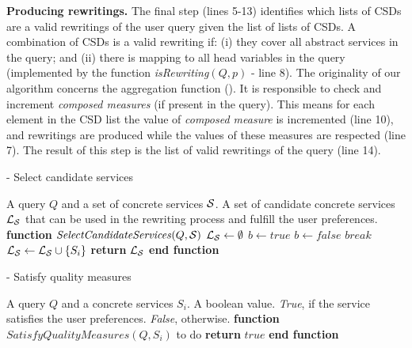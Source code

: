 \noindent \textbf{Producing rewritings.} The final step (lines 5-13) identifies which lists of CSDs are a valid
rewritings of the user query given the list of lists of CSDs.
A combination of CSDs is a valid rewriting if: (i) they cover all abstract services in the query; and 
(ii) there is mapping to all head variables in the query (implemented by the function \textit{isRewriting}$(Q, p)$ - line 8).
The originality of our algorithm concerns the aggregation function ().
It is responsible to check and increment \textit{composed measures} (if present in the query). 
This means for each element in the CSD list the value of \textit{composed measure} is incremented (line 10), and rewritings are produced while the values of these measures are respected (line 7). 
The result of this step is the list of valid 
 rewritings of the query (line 14).%
 
\begin{algorithm}
\caption{ - Select candidate services}
\label{selectingservices}
\begin{algorithmic}[1]
\REQUIRE A query $Q$ and a set of concrete services $\hbox{${\cal S}$}$.
\ENSURE A set of candidate concrete services $\hbox{${\cal L_{S}}$}$ that can be used in the rewriting process and fulfill the user preferences.
\STATE \textbf{function} $\mathit{SelectCandidateServices} (Q, \hbox{${\cal S}$})$
\STATE $\hbox{${\cal L_{S}}$} \leftarrow \emptyset$
		\STATE $b \leftarrow \mathit{true}$		
				\STATE $b \leftarrow \mathit{false}$	
				\STATE $\mathit{break}$
			\ENDIF
		\ENDFOR
			\STATE $\hbox{${\cal L_{S}}$} \leftarrow \hbox{${\cal L_{S}}$} \cup \lbrace S_{i} \rbrace$	
		\ENDIF
	\ENDIF
\ENDFOR
\STATE \textbf{return} $\hbox{${\cal L_{S}}$}$
\STATE \textbf{end function}
\end{algorithmic}
\end{algorithm}

\begin{algorithm}
\caption{ - Satisfy quality measures}
\label{satisfymeasures}
\begin{algorithmic}[1]
\REQUIRE A query $Q$ and a concrete services $S_{i}$.
\ENSURE A boolean value. \textit{True}, if the service satisfies the user preferences. \textit{False}, otherwise.
\STATE \textbf{function} $\mathit{SatisfyQualityMeasures (Q, S_{i})}$
\STATE to do
\STATE \textbf{return} $true$
\STATE \textbf{end function}
\end{algorithmic}
\end{algorithm}

